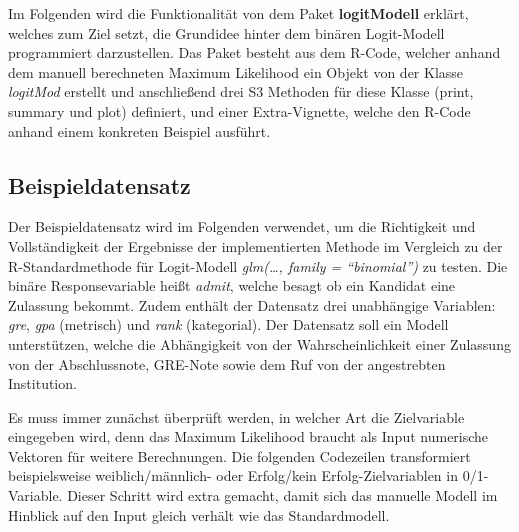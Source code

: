 \documentclass[12pt,]{article}
\newenvironment{Shaded}{\begin{snugshade}}{\end{snugshade}}
\newcommand{\KeywordTok}[1]{\textcolor[rgb]{0.13,0.29,0.53}{\textbf{#1}}}
\newcommand{\DataTypeTok}[1]{\textcolor[rgb]{0.13,0.29,0.53}{#1}}
\newcommand{\DecValTok}[1]{\textcolor[rgb]{0.00,0.00,0.81}{#1}}
\newcommand{\StringTok}[1]{\textcolor[rgb]{0.31,0.60,0.02}{#1}}
\newcommand{\CommentTok}[1]{\textcolor[rgb]{0.56,0.35,0.01}{\textit{#1}}}
\newcommand{\ControlFlowTok}[1]{\textcolor[rgb]{0.13,0.29,0.53}{\textbf{#1}}}
\newcommand{\OperatorTok}[1]{\textcolor[rgb]{0.81,0.36,0.00}{\textbf{#1}}}
\newcommand{\NormalTok}[1]{#1}
\begin{document}
Im Folgenden wird die Funktionalität von dem Paket \textbf{logitModell}
erklärt, welches zum Ziel setzt, die Grundidee hinter dem binären
Logit-Modell programmiert darzustellen. Das Paket besteht aus dem
R-Code, welcher anhand dem manuell berechneten Maximum Likelihood ein
Objekt von der Klasse \emph{logitMod} erstellt und anschließend drei S3
Methoden für diese Klasse (print, summary und plot) definiert, und einer
Extra-Vignette, welche den R-Code anhand einem konkreten Beispiel
ausführt.

\subsection{Beispieldatensatz}\label{beispieldatensatz}

Der Beispieldatensatz wird im Folgenden verwendet, um die Richtigkeit
und Vollständigkeit der Ergebnisse der implementierten Methode im
Vergleich zu der R-Standardmethode für Logit-Modell \emph{glm(\ldots{},
family = ``binomial'')} zu testen. Die binäre Responsevariable heißt
\emph{admit}, welche besagt ob ein Kandidat eine Zulassung bekommt.
Zudem enthält der Datensatz drei unabhängige Variablen: \emph{gre},
\emph{gpa} (metrisch) und \emph{rank} (kategorial). Der Datensatz soll
ein Modell unterstützen, welche die Abhängigkeit von der
Wahrscheinlichkeit einer Zulassung von der Abschlussnote, GRE-Note sowie
dem Ruf von der angestrebten Institution.

Es muss immer zunächst überprüft werden, in welcher Art die Zielvariable
eingegeben wird, denn das Maximum Likelihood braucht als Input
numerische Vektoren für weitere Berechnungen. Die folgenden Codezeilen
transformiert beispielsweise weiblich/männlich- oder Erfolg/kein
Erfolg-Zielvariablen in 0/1-Variable. Dieser Schritt wird extra gemacht,
damit sich das manuelle Modell im Hinblick auf den Input gleich verhält
wie das Standardmodell.

\begin{Shaded}
\end{Shaded}
\end{document}
